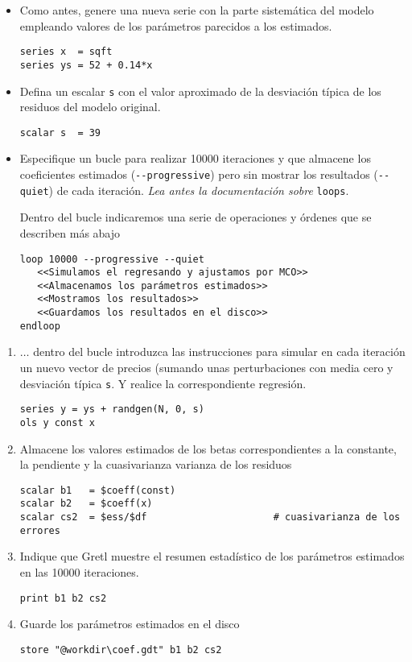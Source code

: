 \documentclass[11pt]{article}
\begin{document}
\begin{itemize}
\item Como antes, genere una nueva serie con la parte sistemática del
modelo empleando valores de los parámetros parecidos a los
estimados.
\begin{verbatim}
series x  = sqft
series ys = 52 + 0.14*x
\end{verbatim}

\item Defina un escalar \texttt{s} con el valor aproximado de la desviación
típica de los residuos del modelo original.
\begin{verbatim}
scalar s  = 39
\end{verbatim}

\item Especifique un bucle para realizar 10000 iteraciones y que almacene
los coeficientes estimados (\texttt{-{}-progressive}) pero sin mostrar los
resultados (\texttt{-{}-quiet}) de cada iteración. \emph{Lea antes la
documentación sobre} \texttt{loops}.

Dentro del bucle indicaremos una serie de operaciones y órdenes que
se describen más abajo
\begin{verbatim}
loop 10000 --progressive --quiet
   <<Simulamos el regresando y ajustamos por MCO>>
   <<Almacenamos los parámetros estimados>>
   <<Mostramos los resultados>>
   <<Guardamos los resultados en el disco>>
endloop  
\end{verbatim}
\end{itemize}


\begin{enumerate}
\item \(\dots\) dentro del bucle introduzca las instrucciones para
simular en cada iteración un nuevo vector de precios (sumando
unas perturbaciones con media cero y desviación típica \texttt{s}. Y
realice la correspondiente regresión.
\begin{verbatim}
series y = ys + randgen(N, 0, s)
ols y const x
\end{verbatim}

\item Almacene los valores estimados de los betas correspondientes a
la constante, la pendiente y la cuasivarianza varianza de los
residuos
\begin{verbatim}
scalar b1   = $coeff(const)
scalar b2   = $coeff(x)
scalar cs2  = $ess/$df                      # cuasivarianza de los errores
\end{verbatim}

\item Indique que Gretl muestre el resumen estadístico de los
parámetros estimados en las 10000 iteraciones.
\begin{verbatim}
print b1 b2 cs2
\end{verbatim}

\item Guarde los parámetros estimados en el disco
\begin{verbatim}
store "@workdir\coef.gdt" b1 b2 cs2
\end{verbatim}
\end{enumerate}
\end{document}
